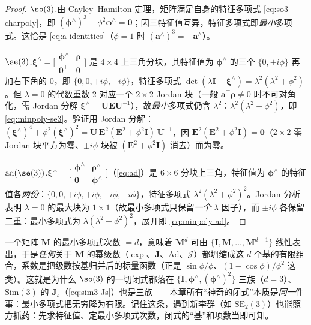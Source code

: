 \begin{proof}
\emph{$\so(3)$.}\;由 Cayley--Hamilton 定理，矩阵满足自身的特征多项式 \cref{eq:so3-charpoly}，即 $(\boldsymbol{\phi}^\wedge)^3+\phi^2\boldsymbol{\phi}^\wedge=\mathbf{0}$；因三特征值互异，特征多项式即\emph{最小}多项式。这恰是 \cref{eq:a-identities}（$\phi=1$ 时 $(\mathbf{a}^\wedge)^3=-\mathbf{a}^\wedge$）。\par
\emph{$\se(3)$.}\;$\boldsymbol{\xi}^\wedge=\big[\begin{smallmatrix}\boldsymbol{\phi}^\wedge&\boldsymbol{\rho}\\\mathbf{0}^\top&0\end{smallmatrix}\big]$ 是 $4\times4$ 上三角分块，其特征值为 $\boldsymbol{\phi}^\wedge$ 的三个 $\{0,\pm i\phi\}$ 再加右下角的 $0$，即 $\{0,0,+i\phi,-i\phi\}$，特征多项式 $\det(\lambda\mathbf{I}-\boldsymbol{\xi}^\wedge)=\lambda^2(\lambda^2+\phi^2)$。但 $\lambda=0$ 的代数重数 $2$ 对应一个 $2\times2$ Jordan 块（一般 $\mathbf{a}^\top\boldsymbol{\rho}\neq0$ 时不可对角化，需 Jordan 分解 $\boldsymbol{\xi}^\wedge=\mathbf{U}\mathbf{E}\mathbf{U}^{-1}$），故\emph{最小}多项式仍含 $\lambda^2$：$\lambda^2(\lambda^2+\phi^2)$，即 \cref{eq:minpoly-se3}。验证用 Jordan 分解：$(\boldsymbol{\xi}^\wedge)^4+\phi^2(\boldsymbol{\xi}^\wedge)^2=\mathbf{U}\,\mathbf{E}^2(\mathbf{E}^2+\phi^2\mathbf{I})\,\mathbf{U}^{-1}$，因 $\mathbf{E}^2(\mathbf{E}^2+\phi^2\mathbf{I})=\mathbf{0}$（$2\times2$ 零 Jordan 块平方为零、$\pm i\phi$ 块被 $(\mathbf{E}^2+\phi^2\mathbf{I})$ 消去）而为零。\par
\emph{$\mathrm{ad}(\se(3))$.}\;$\boldsymbol{\xi}^\curlywedge=\big[\begin{smallmatrix}\boldsymbol{\phi}^\wedge&\boldsymbol{\rho}^\wedge\\\mathbf{0}&\boldsymbol{\phi}^\wedge\end{smallmatrix}\big]$（\cref{eq:ad}）是 $6\times6$ 分块上三角，特征值为 $\boldsymbol{\phi}^\wedge$ 的特征值各\emph{两份}：$\{0,0,+i\phi,+i\phi,-i\phi,-i\phi\}$，特征多项式 $\lambda^2(\lambda^2+\phi^2)^2$。Jordan 分析表明 $\lambda=0$ 的最大块为 $1\times1$（故最小多项式只保留\emph{一个} $\lambda$ 因子），而 $\pm i\phi$ 各保留二重：最小多项式为 $\lambda(\lambda^2+\phi^2)^2$，展开即 \cref{eq:minpoly-ad}。
\end{proof}

\begin{insight}
一个矩阵 $\mathbf{M}$ 的最小多项式次数 $=d$，意味着 $\mathbf{M}^d$ 可由 $\{\mathbf{I},\mathbf{M},\dots,\mathbf{M}^{d-1}\}$ 线性表出，于是\emph{任何}关于 $\mathbf{M}$ 的幂级数（$\exp$、$\mathbf{J}$、$\mathrm{Ad}$、$\boldsymbol{\mathcal{J}}$）都坍缩成这 $d$ 个基的有限组合，系数是把级数按基归并后的标量函数（正是 $\sin\phi/\phi$、$(1-\cos\phi)/\phi^2$ 这类）。这就是为什么 $\so(3)$ 的一切闭式都落在 $\{\mathbf{I},\boldsymbol{\phi}^\wedge,(\boldsymbol{\phi}^\wedge)^2\}$ 三族（$d=3$）、$\mathrm{Sim}(3)$ 的 $\mathbf{J}_s$（\cref{eq:sim3-Js}）也是三族——本章所有“神奇的闭式”本质是\emph{同一}件事：最小多项式把无穷降为有限。记住这条，遇到新李群（如 $\mathrm{SE}_2(3)$）也能照方抓药：先求特征值、定最小多项式次数，闭式的“基”和项数当即可知。
\end{insight}

